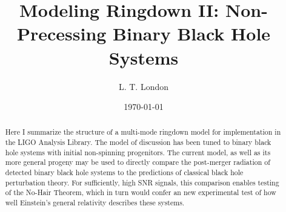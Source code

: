 \documentclass[twocolumn,prd,floatfix,preprintnumbers,a4paper,nofootinbib,superscriptaddress]{revtex4-1}
\begin{document}

\title{Modeling Ringdown II: Non-Precessing Binary Black Hole Systems }

\author{L. T. London}

\begin{abstract}
	Here I summarize the structure of a multi-mode ringdown model for implementation in the LIGO Analysis Library. The model of discussion has been tuned to binary black hole systems with initial non-spinning progenitors. The current model, as well as its more general progeny may be used to directly compare the post-merger radiation of detected binary black hole systems to the predictions of classical black hole perturbation theory. For sufficiently, high SNR signals, this comparison enables testing of the No-Hair Theorem, which in turn would confer an new experimental test of how well Einstein's general relativity describes these systems.
\end{abstract}

\date{\today}

\maketitle
\end{document}
